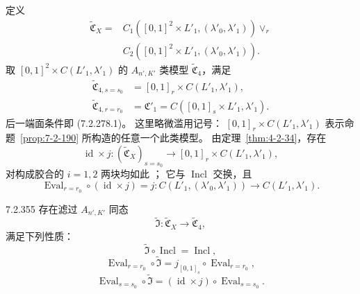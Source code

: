 
定义
\begin{equation}
\begin{aligned}
\widetilde{\mathfrak C}_X
={}&C_1([0,1]^2\times L'_1,
(\lambda'_0,\lambda'_1))\vee_r{}\\
&C_2([0,1]^2\times L'_1,
(\lambda'_0,\lambda'_1)).
\end{aligned}
\tag{7.2.353}\label{eq:7-2-353}
\end{equation}
取 $[0,1]^2\times C(L'_1,\lambda'_1)$
的 $A_{n',K'}$ 类模型
$\widetilde{\mathfrak C}_4$，满足
\[
\begin{aligned}
\widetilde{\mathfrak C}_{4,s=s_0}
&=[0,1]_r\times C(L'_1,\lambda'_1),\\
\widetilde{\mathfrak C}_{4,r=r_0}
&=\mathfrak C'_1
=C([0,1]_s\times L'_1,\lambda'_1).
\end{aligned}
\]
后一端面条件即 (7.2.278.1)。
这里略微滥用记号：
$[0,1]_r\times C(L'_1,\lambda'_1)$
表示命题~\ref{prop:7-2-190}
所构造的任意一个此类模型。
由定理~\ref{thm:4-2-34}，存在
\[
\operatorname{id}\times j\colon
(\widetilde{\mathfrak C}_X)_{s=s_0}
\longrightarrow
[0,1]_r\times C(L'_1,\lambda'_1),
\]
对构成胶合的 $i=1,2$ 两块均如此
；
它与 $\operatorname{Incl}$ 交换，且
\begin{equation}
\operatorname{Eval}_{r=r_0}
\circ(\operatorname{id}\times j)
=j\colon C(L'_1,(\lambda'_0,\lambda'_1))
\longrightarrow C(L'_1,\lambda'_1).
\tag{7.2.354}\label{eq:7-2-354}
\end{equation}

\begin{lemma}{7.2.355}\label{lem:7-2-355}
存在滤过 $A_{n',K'}$ 同态
\[
\widetilde{\mathfrak I}\colon
\widetilde{\mathfrak C}_X
\longrightarrow\widetilde{\mathfrak C}_4,
\]
满足下列性质：
\begin{equation}
\widetilde{\mathfrak I}\circ\operatorname{Incl}
=\operatorname{Incl},
\tag{7.2.356.1}\label{eq:7-2-356-1}
\end{equation}
\begin{equation}
\operatorname{Eval}_{r=r_0}\circ
\widetilde{\mathfrak I}
=j_{[0,1]_s}\circ
\operatorname{Eval}_{r=r_0},
\tag{7.2.356.2}\label{eq:7-2-356-2}
\end{equation}
\begin{equation}
\operatorname{Eval}_{s=s_0}\circ
\widetilde{\mathfrak I}
=(\operatorname{id}\times j)
\circ\operatorname{Eval}_{s=s_0}.
\tag{7.2.356.3}\label{eq:7-2-356-3}
\end{equation}
\end{lemma}

